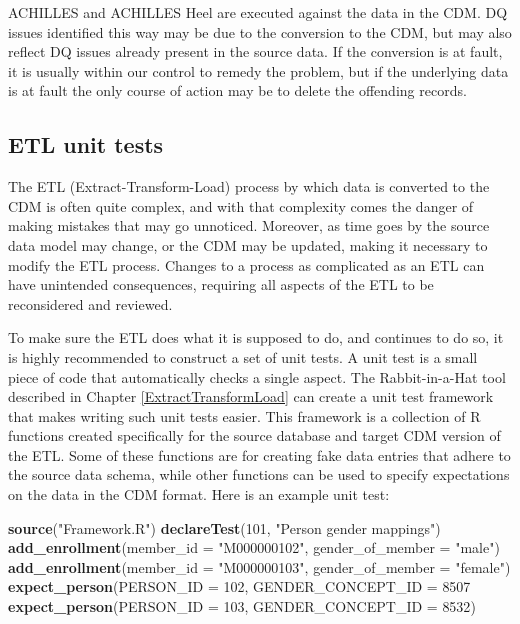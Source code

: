 \documentclass[11pt]{book}
\newenvironment{Shaded}{\begin{snugshade}}{\end{snugshade}}
\newcommand{\DataTypeTok}[1]{\textcolor[rgb]{0.13,0.29,0.53}{#1}}
\newcommand{\DecValTok}[1]{\textcolor[rgb]{0.00,0.00,0.81}{#1}}
\newcommand{\KeywordTok}[1]{\textcolor[rgb]{0.13,0.29,0.53}{\textbf{#1}}}
\newcommand{\NormalTok}[1]{#1}
\newcommand{\StringTok}[1]{\textcolor[rgb]{0.31,0.60,0.02}{#1}}
\theoremstyle{definition}
\theoremstyle{definition}
\theoremstyle{definition}
\theoremstyle{remark}
\let\BeginKnitrBlock\begin \let\EndKnitrBlock\end
\begin{document}
\BeginKnitrBlock{rmdimportant}
ACHILLES and ACHILLES Heel are executed against the data in the CDM. DQ issues identified this way may be due to the conversion to the CDM, but may also reflect DQ issues already present in the source data. If the conversion is at fault, it is usually within our control to remedy the problem, but if the underlying data is at fault the only course of action may be to delete the offending records.
\EndKnitrBlock{rmdimportant}

\hypertarget{etl-unit-tests}{%
\subsection{ETL unit tests}\label{etl-unit-tests}}

The ETL (Extract-Transform-Load) process by which data is converted to the CDM is often quite complex, and with that complexity comes the danger of making mistakes that may go unnoticed. Moreover, as time goes by the source data model may change, or the CDM may be updated, making it necessary to modify the ETL process. Changes to a process as complicated as an ETL can have unintended consequences, requiring all aspects of the ETL to be reconsidered and reviewed.

To make sure the ETL does what it is supposed to do, and continues to do so, it is highly recommended to construct a set of unit tests. A unit test is a small piece of code that automatically checks a single aspect. The Rabbit-in-a-Hat tool described in Chapter \ref{ExtractTransformLoad} can create a unit test framework that makes writing such unit tests easier. This framework is a collection of R functions created specifically for the source database and target CDM version of the ETL. Some of these functions are for creating fake data entries that adhere to the source data schema, while other functions can be used to specify expectations on the data in the CDM format. Here is an example unit test:

\begin{Shaded}
\begin{Highlighting}[]
\KeywordTok{source}\NormalTok{(}\StringTok{"Framework.R"}\NormalTok{)}
\KeywordTok{declareTest}\NormalTok{(}\DecValTok{101}\NormalTok{, }\StringTok{"Person gender mappings"}\NormalTok{)}
\KeywordTok{add_enrollment}\NormalTok{(}\DataTypeTok{member_id =} \StringTok{"M000000102"}\NormalTok{, }\DataTypeTok{gender_of_member =} \StringTok{"male"}\NormalTok{)}
\KeywordTok{add_enrollment}\NormalTok{(}\DataTypeTok{member_id =} \StringTok{"M000000103"}\NormalTok{, }\DataTypeTok{gender_of_member =} \StringTok{"female"}\NormalTok{)}
\KeywordTok{expect_person}\NormalTok{(}\DataTypeTok{PERSON_ID =} \DecValTok{102}\NormalTok{, }\DataTypeTok{GENDER_CONCEPT_ID =} \DecValTok{8507}
\KeywordTok{expect_person}\NormalTok{(}\DataTypeTok{PERSON_ID =} \DecValTok{103}\NormalTok{, }\DataTypeTok{GENDER_CONCEPT_ID =} \DecValTok{8532}\NormalTok{)}
\end{Highlighting}
\end{Shaded}
\end{document}
